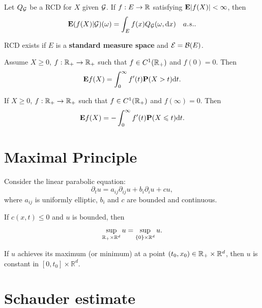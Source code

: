 \begin{proposition}
    Let $Q_{{\mathcal G}}$ be a RCD for $X$ given ${\mathcal G}$. If $f:E\to {\mathbb R}$ satisfying ${\mathbf E} |f(X)|<\infty$, then 
    \[
	{\mathbf E}(f(X)|{\mathcal G})(\omega)= \int_{E} f(x) Q_{{\mathcal G}}(\omega, \text{\rm{d}} x)\quad a.s.. 
    \]
\end{proposition}
	
\begin{theorem}
    RCD exists if $E$ is a {\bf standard measure space} and ${\mathcal E}={\mathcal B}(E)$. 
\end{theorem}
	
\begin{proposition}
    Assume $X\geq 0$, $f:{\mathbb R}_+\to {\mathbb R}_+$ such that $f\in C^1({\mathbb R}_+)$ and $f(0)=0$. Then 
    \begin{equation}
	{\mathbf E} f(X)= \int_0^\infty f'(t) {\mathbf P} (X>t) \text{\rm{d}} t. 
    \end{equation}
\end{proposition}
\begin{exercise}
    If $X\geq 0$, $f:{\mathbb R}_+\to {\mathbb R}_+$ such that $f\in C^1({\mathbb R}_+)$ and $f(\infty)=0$. Then 
    \begin{equation}
	{\mathbf E} f(X)= -\int_0^\infty f'(t) {\mathbf P} (X\leqslant t) \text{\rm{d}} t. 
    \end{equation}
\end{exercise}

\section{Maximal Principle}
Consider the linear parabolic equation:
\[
    \partial_t u = a_{ij}\partial_{ij} u + b_i\partial_i u + cu,
\]
where \(a_{ij}\) is uniformly elliptic, \(b_i\) and \(c\) are bounded and continuous. 

\begin{proposition}
    If \(c(x, t) \leq 0\) and \(u\) is bounded, then 
    \[
    \sup_{{\mathbb R}_+\times\mathbb{R}^d} u = \sup_{\{0\}\times\mathbb{R}^d} u.
    \]
\end{proposition}
\begin{proposition}
    If \(u\) achieves its maximum (or minimum) at a point \((t_0,x_0) \in {\mathbb R}_+\times \mathbb{R}^d\), then \(u\) is constant in \([0, t_0]\times\mathbb{R}^d\).
\end{proposition}

\section{Schauder estimate}\label{app:Schauder}


